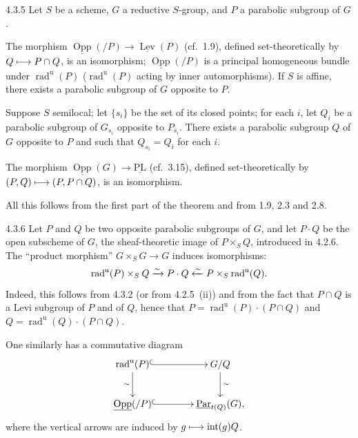 \begin{corollary}{4.3.5}\label{XXVI.4.3.5}
Let $S$ be a scheme, $G$ a reductive $S$-group, and $P$ a parabolic subgroup of $G$.
\begin{enumeratei}
\item The morphism $\underline{\operatorname{Opp}}(/P)\to\underline{\operatorname{Lev}}(P)$ (cf.~1.9), defined set-theoretically by $Q\longmapsto P\cap Q$, is an isomorphism; $\underline{\operatorname{Opp}}(/P)$ is a principal homogeneous bundle under $\operatorname{rad}^{\mathrm u}(P)$ ($\operatorname{rad}^{\mathrm u}(P)$ acting by inner automorphisms). If $S$ is affine, there exists a parabolic subgroup of $G$ opposite to $P$.
\item Suppose $S$ semilocal; let $\{s_i\}$ be the set of its closed points; for each $i$, let $Q_i$ be a parabolic subgroup of $G_{s_i}$ opposite to $P_{s_i}$. There exists a parabolic subgroup $Q$ of $G$ opposite to $P$ and such that $Q_{s_i}=Q_i$ for each $i$.
\item The morphism $\underline{\operatorname{Opp}}(G)\to\underline{\mathrm{PL}}$ (cf.~3.15), defined set-theoretically by $(P,Q)\longmapsto(P,P\cap Q)$, is an isomorphism.
\end{enumeratei}
\end{corollary}
All this follows from the first part of the theorem and from 1.9, 2.3 and 2.8.
\begin{remark}{4.3.6}\label{XXVI.4.3.6}
Let $P$ and $Q$ be two opposite parabolic subgroups of $G$, and let $P\cdot Q$ be the open subscheme of $G$, the sheaf-theoretic image of $P\times_S Q$, introduced in 4.2.6. The ``product morphism'' $G\times_S G\to G$ induces isomorphisms:
\[
\operatorname{rad}^{\mathrm u}(P)\times_S Q\xrightarrow{\sim} P\cdot Q\xleftarrow{\sim} P\times_S\operatorname{rad}^{\mathrm u}(Q).
\]
Indeed, this follows from 4.3.2 (or from 4.2.5~(ii)) and from the fact that $P\cap Q$ is a Levi subgroup of $P$ and of $Q$, hence that $P=\operatorname{rad}^{\mathrm u}(P)\cdot(P\cap Q)$ and $Q=\operatorname{rad}^{\mathrm u}(Q)\cdot(P\cap Q)$.

One similarly has a commutative diagram
\[
\xymatrix@C=40pt@R=24pt{
\operatorname{rad}^{\mathrm u}(P)\ar@{^{(}->}[r]\ar[d]_\sim&G/Q\ar[d]^\sim\\
\underline{\operatorname{Opp}}(/P)\ar@{^{(}->}[r]&\underline{\operatorname{Par}}_{t(Q)}(G),
}
\]
where the vertical arrows are induced by $g\longmapsto\operatorname{int}(g)Q$.
\end{remark}

